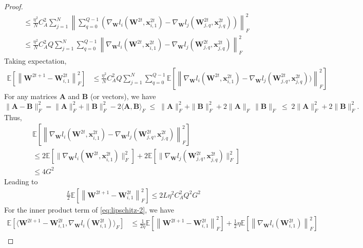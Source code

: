 \begin{proof}
\begin{align}
&\le \frac{\eta^2}{N} C_A^2 \sum_{j=1}^{N} \left\| \sum_{q=0}^{Q-1} \left( \nabla_{\mathbf{W}} l_i(\mathbf{W}^{2t},\mathbf{x}_{i,1}^{2t}) - \nabla_{\mathbf{W}}l_j(\mathbf{W}^{2t}_{j,q},\mathbf{x}_{j,q}^{2t}) \right) \right\|_F^2 \\
& \le \frac{\eta^2}{N} C_A^2 Q \sum_{j=1}^{N} \sum_{q=0}^{Q-1} \left\| \nabla_{\mathbf{W}} l_i(\mathbf{W}^{2t},\mathbf{x}_{i,1}^{2t}) - \nabla_{\mathbf{W}} l_j(\mathbf{W}^{2t}_{j,q},\mathbf{x}_{j,q}^{2t}) \right\|_F^2
\end{align}
Taking expectation, 
\begin{align}
    \mathbb{E} \left[\left\|\mathbf{W}^{2t+1} - \mathbf{W}^{2t}_{i,1} \right\|_F^2  \right]
    & \le \frac{\eta^2}{N} C_A^2 Q \sum_{j=1}^{N} \sum_{q=0}^{Q-1} \mathbb{E} \left[ \left\| \nabla_{\mathbf{W}} l_i(\mathbf{W}^{2t},\mathbf{x}_{i,1}^{2t}) - \nabla_{\mathbf{W}} l_j(\mathbf{W}^{2t}_{j,q},\mathbf{x}_{j,q}^{2t})) \right\|_F^2 \right]
\end{align}
For any matrices $\mathbf{A}$ and $\mathbf{B}$ (or vectors), we have
\[
\| \mathbf A - \mathbf B\|_F^{2}
= \|\mathbf A\|_F^{2} + \|\mathbf B\|_F^{2} - 2\langle \mathbf A, \mathbf B\rangle_F
\;\le\; \|\mathbf A\|_F^{2} + \|\mathbf B\|_F^{2} + 2\|\mathbf A\|_F\,\|\mathbf B\|_F
\;\le\; 2\|\mathbf A\|_F^{2} + 2\|\mathbf B\|_F^{2}.
\]
Thus,
\begin{align}
    &\mathbb{E} \left[ \left\| \nabla_{\mathbf{W}} l_i(\mathbf{W}^{2t},\mathbf{x}_{i,1}^{2t}) - \nabla_{\mathbf{W}} l_j(\mathbf{W}^{2t}_{j,q},\mathbf{x}_{j,q}^{2t}) \right\|_F^2 \right] \nonumber\\&\leq 2 \mathbb{E} \left[ \| \nabla_{\mathbf{W}} l_i(\mathbf{W}^{2t},\mathbf{x}_{i,1}^{2t}) \|_F^2 \right] + 2 \mathbb{E} \left[  \| \nabla_{\mathbf{W}} l_j(\mathbf{W}^{2t}_{j,q},\mathbf{x}_{j,q}^{2t}) \|_F^2 \right] \\
    &\leq 4G^2
\end{align}
Leading to
\begin{align}
    \frac{L}{2} \mathbb{E} \left[\left\|\mathbf{W}^{2t+1} - \mathbf{W}^{2t}_{i,1} \right\|_F^2  \right] \leq 2L \eta^2 C_A^2 Q^2 G^2 \label{quadr-smooth-2}
\end{align}
For the inner product term of \eqref{eq:lipschitz-2}, we have
\begin{align}
    \mathbb{E} \left[ \langle \mathbf{W}^{2t+1} - \mathbf{W}^{2t}_{i,1}, \nabla_{\mathbf{W}} l_i(\mathbf{W}^{2t}_{i,1})\rangle_F \right] & \leq \frac{1}{2\eta} \mathbb{E} \left[ \left\|  \mathbf{W}^{2t+1} - \mathbf{W}^{2t}_{i,1} \right\|_F^2 \right] + \frac{1}{2} \eta \mathbb{E} \left[ \left\| \nabla_{\mathbf{W}} l_i(\mathbf{W}^{2t}_{i,1})  \right\|_F^2 \right] \\

\end{align}
\end{proof}

